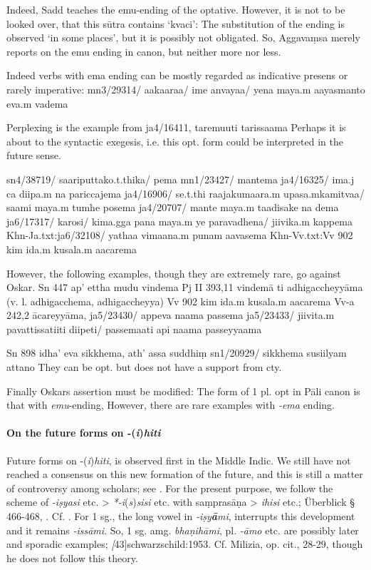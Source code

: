 \documentclass[11pt]{article}
\newcommand*\ṛ{r\symbol{"325}}
\newcommand*\Ṛ{R\symbol{"325}}
\newcommand*\ṝ{r\symbol{"304}\symbol{"325}}
\newcommand*\Ṝ{R\symbol{"304}\symbol{"325}}
\newcommand*\ḷ{l\symbol{"325}}
\newcommand*\ḹ{l\symbol{"304}\symbol{"325}}
\newcommand*\Ḷ{L\symbol{"325}}
\newcommand*\Ḹ{L\symbol{"304}\symbol{"325}}
\begin{document}
Indeed, Sadd teaches the emu-ending of the optative.
However, it is not to be looked over, that this sūtra contains `kvaci':
The substitution of the ending is observed `in some places', but it is possibly not obligated.
So, Aggavaṃsa merely reports on the emu ending in canon, but neither more nor less.

Indeed verbs with ema ending can be mostly regarded as indicative presens or rarely imperative:
mn3/29314/ aakaaraa/ ime anvayaa/ yena maya.m aayasmanto eva.m vadema

Perplexing is the example from ja4/16411, taremuuti tarissaama
Perhaps it is about to the syntactic exegesis, i.e. this opt. form could be interpreted in the future sense.

sn4/38719/ saariputtako.t.thika/ pema
mn1/23427/ mantema
ja4/16325/ ima.j ca diipa.m na pariccajema
ja4/16906/ se.t.thi raajakumaara.m upasa.mkamitvaa/ saami maya.m tumhe posema
ja4/20707/ mante maya.m taadisake na dema
ja6/17317/ karosi/ kima.gga pana maya.m ye paravadhena/ jiivika.m kappema
Khn-Ja.txt:ja6/32108/ yathaa vimaana.m punam aavasema
Khn-Vv.txt:Vv 902  kim ida.m kusala.m aacarema



However, the following examples, though they are extremely rare, go against Oskar.
Sn 447 ap' ettha mudu vindema Pj II 393,11  vindemā ti adhigaccheyyāma (v. l. adhigacchema, adhigaccheyya)
Vv 902  kim ida.m kusala.m aacarema
Vv-a 242,2 ācareyyāma, 
ja5/23430/ appeva naama passema
ja5/23433/ jiivita.m pavattissatiiti diipeti/ passemaati api naama passeyyaama

Sn 898 idha' eva sikkhema, ath' assa suddhiṃ
sn1/20929/ sikkhema susiilyam attano
They can be opt. but does not have a support from cty.

Finally Oskars assertion must be modified:
The form of 1 pl. opt in Pāli canon is that with \textit{emu}-ending,
However, there are rare examples with \textit{-ema} ending.

\paragraph*{On the future forms on -(\textit{i})\textit{hiti}}
Future forms on -(\textit{i})\textit{hiti}, is observed first in the Middle Indic.
We still have not reached a consensus on this new formation of the future, and this is still a matter of controversy among scholars; see \citet{Milizia:2011}.
For the present purpose, we follow the scheme of \textit{-iṣyasi} etc. > \textit{*-i}(\textit{s})\textit{sisi} etc. with saṃprasāṇa > \textit{ihisi} etc.; Überblick § 466-468, \citet[78ff.]{berger:1955}. Cf. \citet[155ff.]{Tedesco:1945}.
For 1 sg., the long vowel in \textit{-iṣy\textbf{ā}mi}, interrupts this development and it remains \textit{-issāmi}.
So, 1 sg. amg. \textit{bhaṇihāmi}, pl. \textit{-āmo} etc. are possibly later and sporadic examples; \textit[43]{schwarzschild:1953}. Cf. Milizia, op. cit., 28-29, though he does not follow this theory.
\end{document}
